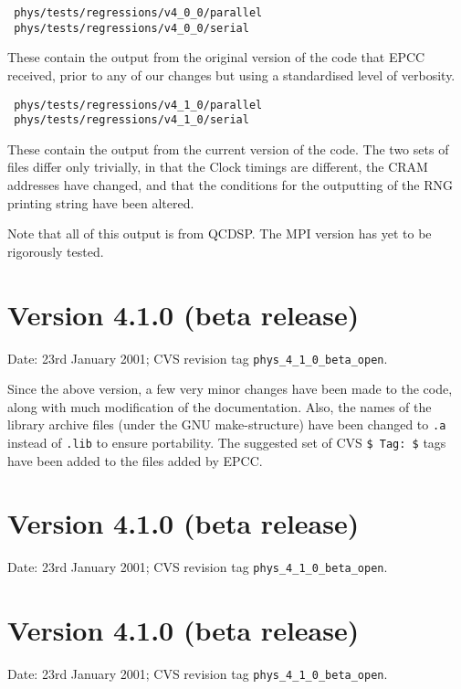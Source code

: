 \documentclass[12pt]{article}
\newcommand{\cde}[1]{{\tt #1}}            %
\begin{document}
\begin{verbatim}
 phys/tests/regressions/v4_0_0/parallel
 phys/tests/regressions/v4_0_0/serial
\end{verbatim}

These contain the output from the original version of the code that EPCC
received, prior to any of our changes but using a standardised level of
verbosity.

\begin{verbatim}
 phys/tests/regressions/v4_1_0/parallel
 phys/tests/regressions/v4_1_0/serial
\end{verbatim}

These contain the output from the current version of the code.  The
two sets of files differ only trivially, in that the Clock timings are
different, the CRAM addresses have changed, and that the conditions
for the outputting of the RNG printing string have been altered.

Note that all of this output is from QCDSP.  The MPI version has yet to be
rigorously tested.

\section{Version 4.1.0 (beta release)}
Date: 23rd January 2001; CVS revision tag \cde{phys\_4\_1\_0\_beta\_open}.

Since the above version, a few very minor changes have been made to the code,
along with much modification of the documentation.  Also, the names of the
library archive files (under the GNU make-structure) have been changed to
\cde{*.a} instead of \cde{*.lib} to ensure portability.  The suggested set of
CVS \cde{\$ Tag: \$} tags have been added to the files added by EPCC.

\section{Version 4.1.0 (beta release)}
Date: 23rd January 2001; CVS revision tag \cde{phys\_4\_1\_0\_beta\_open}.
\section{Version 4.1.0 (beta release)}
Date: 23rd January 2001; CVS revision tag \cde{phys\_4\_1\_0\_beta\_open}.
\end{document}
